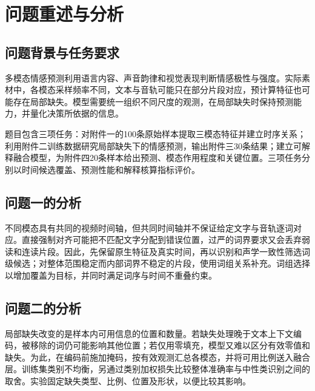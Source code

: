 \section{问题重述与分析}
\subsection{问题背景与任务要求}
多模态情感预测利用语言内容、声音韵律和视觉表现判断情感极性与强度。实际素材中，各模态采样频率不同，文本与音轨可能只在部分片段对应，预计算特征也可能存在局部缺失。模型需要统一组织不同尺度的观测，在局部缺失时保持预测能力，并量化决策所依据的信息。

题目包含三项任务：对附件一的100条原始样本提取三模态特征并建立时序关系；利用附件二训练数据研究局部缺失下的情感预测，输出附件三30条结果；建立可解释融合模型，为附件四20条样本给出预测、模态作用程度和关键位置。三项任务分别以时间候选覆盖、预测性能和解释核算指标评价。

\subsection{问题一的分析}
不同模态具有共同的视频时间轴，但共同时间轴并不保证给定文字与音轨逐词对应。直接强制对齐可能把不匹配文字分配到错误位置，过严的词界要求又会丢弃弱读和连读片段。因此，先保留原生特征及真实时间，再以识别和声学一致性筛选词级候选；对整体范围稳定而内部词界不稳定的片段，使用词组关系补充。词组选择以增加覆盖为目标，并同时满足词序与时间不重叠约束。

\subsection{问题二的分析}
局部缺失改变的是样本内可用信息的位置和数量。若缺失处理晚于文本上下文编码，被移除的词仍可能影响其他位置；若仅用零填充，模型又难以区分有效零值和缺失。为此，在编码前施加掩码，按有效观测汇总各模态，并将可用比例送入融合层。训练集类别不均衡，另通过类别加权损失比较整体准确率与中性类识别之间的取舍。实验固定缺失类型、比例、位置及形状，以便比较其影响。

